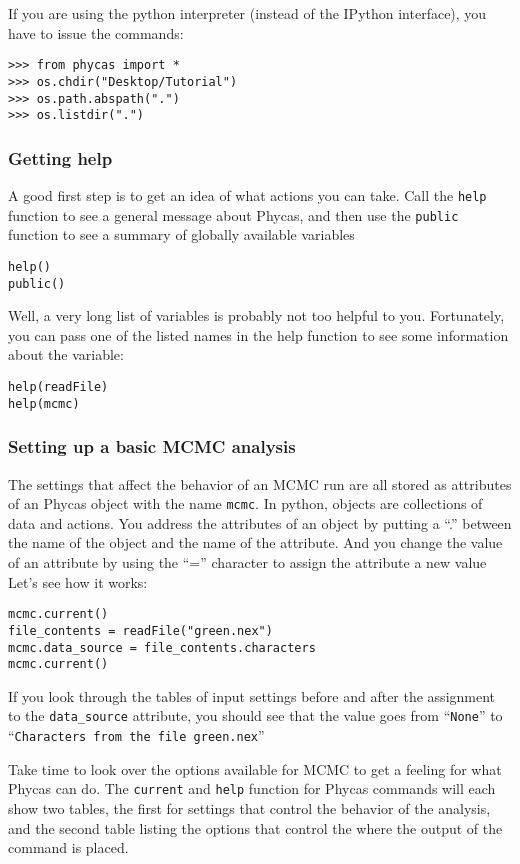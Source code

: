 \documentclass{article}
\newcommand{\cmdopt}[1]{\texttt{#1}\xspace}
\newcommand{\cmd}[1]{\texttt{#1}\xspace}
\newcommand{\phycas}{Phycas\xspace}
\begin{document}
If you are using the  python interpreter (instead of the IPython interface), you have to issue the commands:
\begin{verbatim}
>>> from phycas import *
>>> os.chdir("Desktop/Tutorial")
>>> os.path.abspath(".")
>>> os.listdir(".")
\end{verbatim}

\subsubsection{Getting help}
A good first step is to get an idea of what actions you can take. 
Call the \cmd{help} function to see a general message about \phycas, and then
use the \cmd{public} function to see a summary of globally available
variables
\begin{verbatim}
help()
public()
\end{verbatim}

Well, a very long list of variables is probably not too helpful to you.
Fortunately, you can pass one of the listed names in the help function to see 
some information about the variable:
\begin{verbatim}
help(readFile)
help(mcmc)
\end{verbatim}

\subsubsection{Setting up a basic MCMC analysis}
The settings that affect the behavior of an MCMC run are all stored
as attributes of an \phycas object with the name \cmd{mcmc}.
In python, objects are collections of data and actions.
You address the attributes of an object by putting a ``.'' between
the name of the object and the name of the attribute.
And you change the value of an attribute by using the ``='' character
to assign the attribute a new value
Let's see how it works:
\begin{verbatim}
mcmc.current()
file_contents = readFile("green.nex")
mcmc.data_source = file_contents.characters
mcmc.current()
\end{verbatim}
If you look through the tables of input settings before and after
the assignment to the \cmdopt{data\_source} attribute, you should see
that the value goes from ``\cmd{None}'' to ``\cmd{Characters from the file green.nex}''

Take time to look over the options available for MCMC to get a feeling for
what \phycas can do.
The \cmd{current} and \cmd{help} function for \phycas commands will 
each show two tables, the first for settings that control the behavior
of the analysis, and the second table listing the options that control
the where the output of the command is placed.
\end{document}
